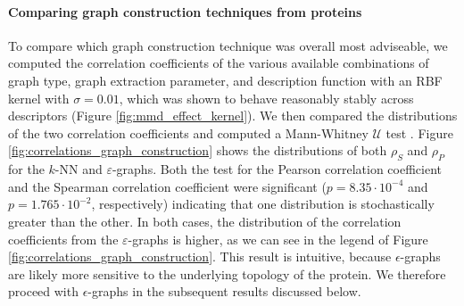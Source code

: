 \paragraph{Comparing graph construction techniques from proteins} To compare which graph
construction technique was overall most adviseable, we computed the correlation
coefficients of the various available combinations of graph type, graph
extraction parameter, and description function with an RBF kernel with
$\sigma=0.01$, which was shown to behave reasonably stably across descriptors
(Figure \ref{fig:mmd_effect_kernel}). We then compared the distributions of the
two correlation coefficients and computed a Mann-Whitney $\mathcal{U}$ test
\citep{fay2010wilcoxon}. Figure \ref{fig:correlations_graph_construction} shows
the distributions of both $\rho_S$ and $\rho_P$ for the $k$-NN and
$\varepsilon$-graphs. Both the test for the Pearson correlation coefficient and
the Spearman correlation coefficient were significant ($p=8.35\cdot 10^{-4}$ and
$p=1.765\cdot 10^{-2}$, respectively) indicating that one distribution is
stochastically greater than the other. In both cases, the distribution of the
correlation coefficients from the $\varepsilon$-graphs is higher, as we can see
in the legend of Figure \ref{fig:correlations_graph_construction}. This result
is intuitive, because $\epsilon$-graphs are likely more sensitive to the
underlying topology of the protein. We therefore proceed with $\epsilon$-graphs
in the subsequent results discussed below.

